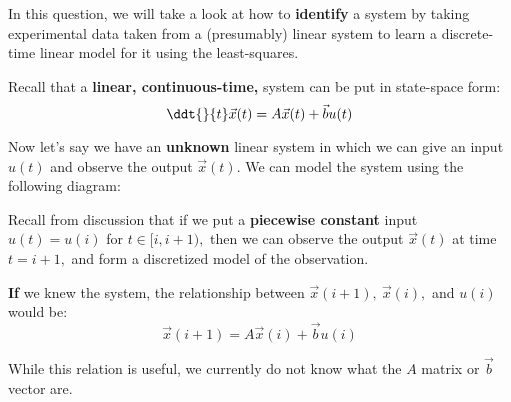 

In this question, we will take a look at how to \textbf{identify} a system by taking experimental data taken from a (presumably) linear system to learn a discrete-time linear model for it using the least-squares.

Recall that a \textbf{linear, continuous-time,} system can be put in state-space form:
\begin{equation}
\ddt{}{t} \vec{x}(t) = A \vec{x}(t) + \vec{b} u(t)
\end{equation}

Now let's say we have an \textbf{unknown} linear system in which we can give an input $u(t)$ and observe the output $\vec{x}(t).$ We can model the system using the following diagram:
\begin{center}
\end{center}

Recall from discussion that if we put a \textbf{piecewise constant} input $u(t) = u(i)$ for $t \in [i, i+1),$ then we can observe the output $\vec{x}(t)$ at time $t = i + 1,$ and form a discretized model of the observation. 

\begin{center}
\end{center}

\textbf{If} we knew the system, the relationship between $\vec{x}(i+1), \ \vec{x}(i), $ and $u(i)$ would be:
\begin{equation}
\vec{x}(i + 1) = A \vec{x}(i) + \vec{b} u(i)
\end{equation}

While this relation is useful, we currently do not know what the $A$ matrix or $\vec{b}$ vector are.

